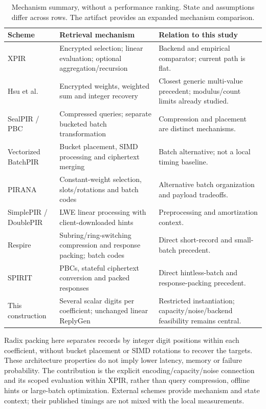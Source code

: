 \begin{table}[t]
\centering
\caption{Mechanism summary, without a performance ranking. State and
assumptions differ across rows. The artifact provides an expanded mechanism comparison.}
\label{tab:mechanisms}
\small
\setlength{\tabcolsep}{3pt}
\begin{tabular}{@{}>{\raggedright\arraybackslash}p{2.0cm}>{\raggedright\arraybackslash}p{4.1cm}>{\raggedright\arraybackslash}p{4.7cm}@{}}
\toprule
Scheme & Retrieval mechanism & Relation to this study \\
\midrule
XPIR & Encrypted selection; linear evaluation; optional aggregation/recursion & Backend and empirical comparator; current path is flat. \\
Hsu et al. & Encrypted weights, weighted sum and integer recovery & Closest generic multi-value precedent; modulus/count limits already studied. \\
SealPIR / PBC & Compressed queries; separate bucketed batch transformation & Compression and placement are distinct mechanisms. \\
Vectorized BatchPIR & Bucket placement, SIMD processing and ciphertext merging & Batch alternative; not a local timing baseline. \\
PIRANA & Constant-weight selection, slots/rotations and batch codes & Alternative batch organization and payload tradeoffs. \\
SimplePIR / DoublePIR & LWE linear processing with client-downloaded hints & Preprocessing and amortization context. \\
Respire & Subring/ring-switching compression and response packing; batch codes & Direct short-record and small-batch precedent. \\
SPIRIT & PBCs, stateful ciphertext conversion and packed responses & Direct hintless-batch and response-packing precedent. \\
This construction & Several scalar digits per coefficient; unchanged linear ReplyGen & Restricted instantiation; capacity/noise/backend feasibility remains central. \\
\bottomrule
\end{tabular}
\end{table}


Radix packing here separates records by integer digit positions within
each coefficient, without bucket placement or SIMD rotations to recover
the targets. These architecture properties do not imply lower latency,
memory or failure probability. The contribution is the explicit
encoding/capacity/noise connection and its scoped evaluation within
XPIR, rather than query compression, offline hints or large-batch
optimization. External schemes provide mechanism and state context;
their published timings are not mixed with the local measurements.
